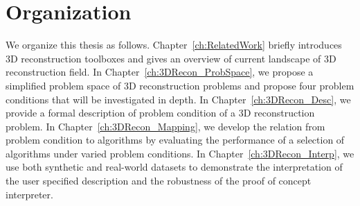 



\section{Organization}
We organize this thesis as follows. Chapter~\ref{ch:RelatedWork} briefly introduces 3D reconstruction toolboxes and gives an overview of current landscape of 3D reconstruction field. In Chapter~\ref{ch:3DRecon_ProbSpace}, we propose a simplified problem space of 3D reconstruction problems and propose four problem conditions that will be investigated in depth. In Chapter~\ref{ch:3DRecon_Desc}, we provide a formal description of problem condition of a 3D reconstruction problem. In Chapter~\ref{ch:3DRecon_Mapping}, we develop the relation from problem condition to algorithms by evaluating the performance of a selection of algorithms under varied problem conditions. In Chapter~\ref{ch:3DRecon_Interp}, we use both synthetic and real-world datasets to demonstrate the interpretation of the user specified description and the robustness of the proof of concept interpreter.
